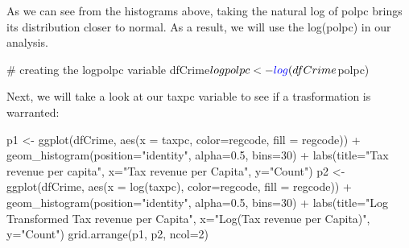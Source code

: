 \documentclass[]{article}
\newenvironment{Shaded}{}{}
\newcommand{\CommentTok}[1]{\textcolor[rgb]{0.00,0.50,0.00}{#1}}
\newcommand{\DataTypeTok}[1]{#1}
\newcommand{\DecValTok}[1]{#1}
\newcommand{\FloatTok}[1]{#1}
\newcommand{\KeywordTok}[1]{\textcolor[rgb]{0.00,0.00,1.00}{#1}}
\newcommand{\NormalTok}[1]{#1}
\newcommand{\OperatorTok}[1]{#1}
\newcommand{\StringTok}[1]{\textcolor[rgb]{0.00,0.50,0.50}{#1}}
\begin{document}
As we can see from the histograms above, taking the natural log of polpc
brings its distribution closer to normal. As a result, we will use the
log(polpc) in our analysis.

\begin{Shaded}
\begin{Highlighting}[]
\CommentTok{# creating the logpolpc variable}
\NormalTok{dfCrime}\OperatorTok{$}\NormalTok{logpolpc <-}\StringTok{ }\KeywordTok{log}\NormalTok{(dfCrime}\OperatorTok{$}\NormalTok{polpc)}
\end{Highlighting}
\end{Shaded}

Next, we will take a look at our taxpc variable to see if a
trasformation is warranted:

\begin{Shaded}
\begin{Highlighting}[]
\NormalTok{p1 <-}\StringTok{ }\KeywordTok{ggplot}\NormalTok{(dfCrime, }\KeywordTok{aes}\NormalTok{(}\DataTypeTok{x =}\NormalTok{ taxpc, }\DataTypeTok{color=}\NormalTok{regcode, }\DataTypeTok{fill =}\NormalTok{ regcode)) }\OperatorTok{+}\StringTok{ }
\StringTok{  }\KeywordTok{geom_histogram}\NormalTok{(}\DataTypeTok{position=}\StringTok{"identity"}\NormalTok{, }\DataTypeTok{alpha=}\FloatTok{0.5}\NormalTok{, }\DataTypeTok{bins=}\DecValTok{30}\NormalTok{) }\OperatorTok{+}
\StringTok{  }\KeywordTok{labs}\NormalTok{(}\DataTypeTok{title=}\StringTok{"Tax revenue per capita"}\NormalTok{, }\DataTypeTok{x=}\StringTok{"Tax revenue per Capita"}\NormalTok{, }\DataTypeTok{y=}\StringTok{"Count"}\NormalTok{)}
\NormalTok{p2 <-}\StringTok{ }\KeywordTok{ggplot}\NormalTok{(dfCrime, }\KeywordTok{aes}\NormalTok{(}\DataTypeTok{x =} \KeywordTok{log}\NormalTok{(taxpc), }\DataTypeTok{color=}\NormalTok{regcode, }\DataTypeTok{fill =}\NormalTok{ regcode)) }\OperatorTok{+}\StringTok{ }
\StringTok{  }\KeywordTok{geom_histogram}\NormalTok{(}\DataTypeTok{position=}\StringTok{"identity"}\NormalTok{, }\DataTypeTok{alpha=}\FloatTok{0.5}\NormalTok{, }\DataTypeTok{bins=}\DecValTok{30}\NormalTok{) }\OperatorTok{+}
\StringTok{  }\KeywordTok{labs}\NormalTok{(}\DataTypeTok{title=}\StringTok{"Log Transformed Tax revenue per Capita"}\NormalTok{, }\DataTypeTok{x=}\StringTok{"Log(Tax revenue per Capita)"}\NormalTok{, }\DataTypeTok{y=}\StringTok{"Count"}\NormalTok{)}
\KeywordTok{grid.arrange}\NormalTok{(p1, p2, }\DataTypeTok{ncol=}\DecValTok{2}\NormalTok{)}
\end{Highlighting}
\end{Shaded}
\end{document}
